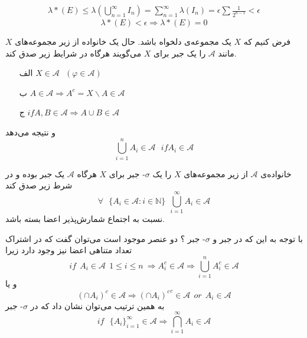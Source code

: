 \begin{align}
{\lambda}*(E) \leq \lambda(\bigcup_{n = 1}^{\infty} I_n) = \sum_{n = 1}^{\infty} \lambda(I_n) = \epsilon \sum \frac{1}{2^{n - 1}} < \epsilon \nonumber
\end{align}
\begin{equation*}
 {\lambda}*(E) < \epsilon \Rightarrow {\lambda}*(E) = 0
\end{equation*}
\begin{definition}[\bf جبر]
فرض کنیم که 
$ X $
یک مجموعه‌ی دلخواه باشد. حال یک خانواده از زیر مجموعه‌های 
$ X $
مانند 
$ \mathcal{A} $
را یک جبر برای 
$ X $
می‌گویند هرگاه در شرایط زیر صدق کند.
\begin{itemize}
\item [الف]$X \in \mathcal{A} \ \ \ (\varphi \in \mathcal{A}) $
\item [ب] $A \in \mathcal{A} \Rightarrow {A}^c = X \backslash A \in \mathcal{A}$ 
\item [ج] $if A, B \in \mathcal{A} \Rightarrow A \cup B \in \mathcal{A} $
\end{itemize}
و نتیجه می‌دهد 
\begin{equation*}
\bigcup^{n}_{i = 1} A_i \in \mathcal{A} \ \ \ if A_i \in \mathcal{A}
\end{equation*}
\end{definition}
\begin{definition}
خانواده‌ی 
$ \mathcal{A} $ 
از زیر‌ مجموعه‌های 
$ X $
را یک 
$ \sigma $-
جبر برای
$ X $
هرگاه 
$ \mathcal{A} $
یک جبر بوده و در شرط زیر صدق کند
\begin{equation*}
\forall \ \ \ \lbrace A_i \in \mathcal{A} : i \in \mathbb{N} \rbrace \ \ \bigcup^{\infty}_{i = 1} A_i \in \mathcal{A}
\end{equation*}
نسبت به اجتماع شمارش‌پذیر اعضا بسته باشد.
\end{definition}
\begin{remark}
با توجه به این که در جبر و 
$ \sigma $-
جبر ؟ دو عنصر موجود است می‌توان گفت که در اشتراک تعداد متناهی اعضا نیز وجود دارد زیرا 
\begin{equation*}
if \ \ A_i \in \mathcal{A} \ \ 1 \leq i \leq n \ \Rightarrow A_i^c \in \mathcal{A} \Rightarrow \bigcup^{n}_{i = 1} A_i^c \in \mathcal{A}
\end{equation*}
و یا
\begin{equation*}
(\cap A_i)^c \in \mathcal{A} \Rightarrow {(\cap A_i)^c}^c \in \mathcal{A} \ \ or \ \ A_i \in \mathcal{A}
\end{equation*}
به‌ همین ترتیب می‌توان نشان داد که در 
$ \sigma $-
جبر
\begin{equation*}
if \ \ \ {\lbrace A_i \rbrace}^{\infty}_{i = 1} \in \mathcal{A} \Rightarrow \bigcap^{\infty}_{i = 1} A_i \in \mathcal{A}
\end{equation*}
\end{remark}
